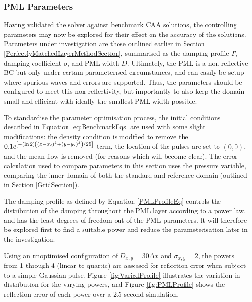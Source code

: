 \subsubsection{PML Parameters}

Having validated the solver against benchmark CAA solutions, the controlling parameters may now be explored for their effect on the accuracy of the solutions. Parameters under investigation are those outlined earlier in Section \ref{PerfectlyMatchedLayerMethodSection}, summarised as the damping profile $
\Gamma$, damping coefficient $\sigma$, and PML width $D$. Ultimately, the PML is a non-reflective BC but only under certain parameterised circumstances, and can easily be setup where spurious waves and errors are supported. Thus, the parameters should be configured to meet this non-reflectivity, but importantly to also keep the domain small and efficient with ideally the smallest PML width possible.

To standardise the parameter optimisation process, the initial conditions described in Equation \ref{eq:BenchmarkEqs} are used with some slight modifications: the density condition is modified to remove the $0.1 e^{\left[ - \left( \mathrm{ln} \, 2 \right) \\ \left( \left(x-x_2 \right)^2 + \left(y-y_2 \right)^2 \right)/25 \right]}$ term, the location of the pulses are set to $\left(0,0\right)$, and the mean flow is removed (for reasons which will become clear). The error calculation used to compare parameters in this section uses the pressure variable, comparing the inner domain of both the standard and reference domain (outlined in Section \ref{GridSection}).


The damping profile as defined by Equation \ref{PMLProfileEq} controls the distribution of the damping throughout the PML layer according to a power law, and has the least degrees of freedom out of the PML parameters. It will therefore be explored first to find a suitable power and reduce the parameterisation later in the investigation.

Using an unoptimised configuration of $D_{x,y}=30\Delta x$ and $\sigma_{x,y}=2$, the powers from 1 through 4 (linear to quartic) are assessed for reflection error when subject to a simple Gaussian pulse. Figure \ref{fig:VariedProfile} illustrates the variation in distribution for the varying powers, and Figure \ref{fig:PMLProfile} shows the reflection error of each power over a 2.5 second simulation.


